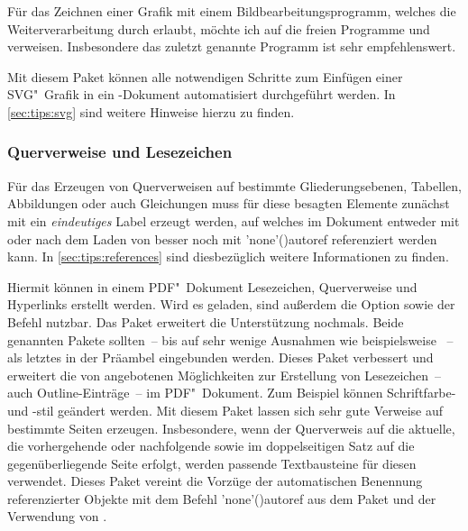 Für das Zeichnen einer Grafik mit einem Bildbearbeitungsprogramm, welches die 
Weiterverarbeitung durch  erlaubt, möchte ich auf die freien 
Programme  und  verweisen. 
Insbesondere das zuletzt genannte Programm ist sehr empfehlenswert. 

\begin{DeclarePackages}[Grafiken|?]
  Mit diesem Paket können alle notwendigen Schritte zum Einfügen einer 
  SVG"~Grafik in ein -Dokument automatisiert durchgeführt 
  werden. In \autoref{sec:tips:svg} sind weitere Hinweise hierzu zu finden.%
\end{DeclarePackages}



\subsubsection{%
  Querverweise und Lesezeichen%
}

Für das Erzeugen von Querverweisen auf bestimmte Gliederungsebenen, Tabellen, 
Abbildungen oder auch Gleichungen muss für diese besagten Elemente zunächst mit 
 ein \emph{eindeutiges} Label erzeugt werden, 
auf welches im Dokument entweder mit  oder nach dem Laden von 
 besser noch mit \Macro'none'(){autoref} 
referenziert werden kann. In \autoref{sec:tips:references} sind diesbezüglich 
weitere Informationen zu finden.

\begin{DeclarePackages}
  Hiermit können in einem PDF"~Dokument Lesezeichen, Querverweise und 
  Hyperlinks erstellt werden. Wird es geladen, sind außerdem die Option 
   sowie der Befehl  nutzbar. Das 
  Paket  erweitert die Unterstützung nochmals. Beide 
  genannten Pakete sollten~-- bis auf sehr wenige Ausnahmen wie beispielsweise 
  ~-- als letztes in der Präambel eingebunden werden.
  Dieses Paket verbessert und erweitert die von  angebotenen 
  Möglichkeiten zur Erstellung von Lesezeichen~-- auch Outline-Einträge~-- im 
  PDF"~Dokument. Zum Beispiel können Schriftfarbe- und -stil geändert werden.
  Mit diesem Paket lassen sich sehr gute Verweise auf bestimmte Seiten 
  erzeugen. Insbesondere, wenn der Querverweis auf die aktuelle, die 
  vorhergehende oder nachfolgende sowie im doppelseitigen Satz auf die 
  gegenüberliegende Seite erfolgt, werden passende Textbausteine für diesen 
  verwendet.
  Dieses Paket vereint die Vorzüge der automatischen Benennung referenzierter 
  Objekte mit dem Befehl \Macro'none'(){autoref} aus dem 
  Paket  und der Verwendung von .
\end{DeclarePackages}




